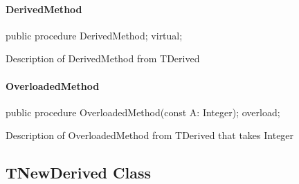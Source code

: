 \documentclass{report}
\begin{document}
\paragraph*{DerivedMethod}\hspace*{\fill}

\begin{list}{}{
\setlength{\itemindent}{0cm}
\setlength{\listparindent}{0cm}
\setlength{\leftmargin}{\evensidemargin}
\addtolength{\leftmargin}{\tmplength}
\settowidth{\labelsep}{X}
\addtolength{\leftmargin}{\labelsep}
\setlength{\labelwidth}{\tmplength}
}
\begin{flushleft}
\item[\textbf{Declaration}\hfill]
\begin{ttfamily}
public procedure DerivedMethod; virtual;\end{ttfamily}


\end{flushleft}
\par
\item[\textbf{Description}]
Description of DerivedMethod from TDerived

\end{list}
\paragraph*{OverloadedMethod}\hspace*{\fill}

\begin{list}{}{
\setlength{\itemindent}{0cm}
\setlength{\listparindent}{0cm}
\setlength{\leftmargin}{\evensidemargin}
\addtolength{\leftmargin}{\tmplength}
\settowidth{\labelsep}{X}
\addtolength{\leftmargin}{\labelsep}
\setlength{\labelwidth}{\tmplength}
}
\begin{flushleft}
\item[\textbf{Declaration}\hfill]
\begin{ttfamily}
public procedure OverloadedMethod(const A: Integer); overload;\end{ttfamily}


\end{flushleft}
\par
\item[\textbf{Description}]
Description of OverloadedMethod from TDerived that takes Integer

\end{list}
\subsection*{TNewDerived Class}
\end{document}

